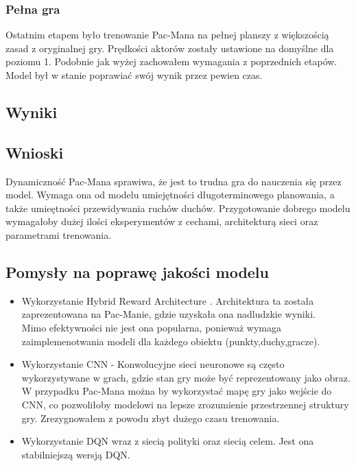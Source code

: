 \documentclass[12pt, draft]{report}
\begin{document}
\subsubsection{Pełna gra}
Ostatnim etapem było trenowanie Pac-Mana na pełnej planszy z większością zasad z oryginalnej gry. Prędkości aktorów zostały ustawione na domyślne dla poziomu 1.
Podobnie jak wyżej zachowałem wymagania z poprzednich etapów.
Model był w stanie poprawiać swój wynik przez pewien czas.

\subsection{Wyniki}

\subsection{Wnioski}
Dynamiczność Pac-Mana sprawiwa, że jest to trudna gra do nauczenia się przez model. Wymaga ona od modelu umiejętności długoterminowego planowania, a także umieętności przewidywania ruchów duchów.
Przygotowanie dobrego modelu wymagałoby dużej ilości eksperymentów z cechami, architekturą sieci oraz parametrami trenowania.

\subsection{Pomysły na poprawę jakości modelu}
\begin{itemize}
    \item Wykorzystanie Hybrid Reward Architecture \cite{vanseijen2017hybridrewardarchitecturereinforcement}. Architektura ta została zaprezentowana na Pac-Manie, gdzie uzyskała ona nadludzkie wyniki. \\ Mimo efektywności nie jest ona popularna, ponieważ wymaga zaimplemenotwania modeli dla każdego obiektu (punkty,duchy,gracze).
    \item Wykorzystanie CNN - Konwolucyjne sieci neuronowe są często wykorzystywane w grach, gdzie stan gry może być reprezentowany jako obraz. W przypadku Pac-Mana można by wykorzystać mapę gry jako wejście do CNN, co pozwoliłoby modelowi na lepsze zrozumienie przestrzennej struktury gry. Zrezygnowałem z powodu zbyt dużego czasu trenowania.
    \item Wykorzystanie DQN wraz z siecią polityki oraz siecią celem. Jest ona stabilniejszą wersją DQN.
\end{itemize}

\printbibliography
\end{document}
